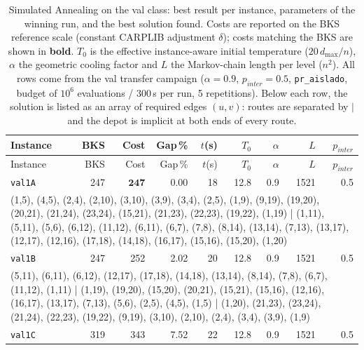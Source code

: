 \begin{landscape}
\begingroup\scriptsize\renewcommand{\arraystretch}{0.95}
\begin{longtable}{lrrrrrrrr}
\caption{Simulated Annealing on the val class: best result per instance, parameters of the winning run, and the best solution found. Costs are reported on the BKS reference scale (constant CARPLIB adjustment $\delta$); costs matching the BKS are shown in \textbf{bold}. $T_0$ is the effective instance-aware initial temperature ($20\,d_{\max}/n$), $\alpha$ the geometric cooling factor and $L$ the Markov-chain length per level ($n^2$). All rows come from the val transfer campaign ($\alpha = 0.9$, $p_{inter} = 0.5$, \texttt{pr\_aislado}, budget of $10^6$ evaluations / 300\,s per run, 5 repetitions). Below each row, the solution is listed as an array of required edges $(u,v)$: routes are separated by $|$ and the depot is implicit at both ends of every route.}\label{tab:sa-val-per-instance}\\
\toprule
Instance & BKS & Cost & Gap\,\% & $t$(s) & $T_0$ & $\alpha$ & $L$ & $p_{inter}$ \\
\midrule
\endfirsthead
\toprule
Instance & BKS & Cost & Gap\,\% & $t$(s) & $T_0$ & $\alpha$ & $L$ & $p_{inter}$ \\
\midrule
\endhead
\bottomrule
\endfoot
\texttt{val1A} & 247 & $\mathbf{247}$ & 0.00 & 18 & 12.8 & 0.9 & 1521 & 0.5 \\
\multicolumn{9}{p{0.96\linewidth}}{\tiny\raggedright\arraybackslash (1,5), (4,5), (2,4), (2,10), (3,10), (3,9), (3,4), (2,5), (1,9), (9,19), (19,20), (20,21), (21,24), (23,24), (15,21), (21,23), (22,23), (19,22), (1,19) | (1,11), (5,11), (5,6), (6,12), (11,12), (6,11), (6,7), (7,8), (8,14), (13,14), (7,13), (13,17), (12,17), (12,16), (17,18), (14,18), (16,17), (15,16), (15,20), (1,20)} \\[2pt]
\texttt{val1B} & 247 & 252 & 2.02 & 20 & 12.8 & 0.9 & 1521 & 0.5 \\
\multicolumn{9}{p{0.96\linewidth}}{\tiny\raggedright\arraybackslash (5,11), (6,11), (6,12), (12,17), (17,18), (14,18), (13,14), (8,14), (7,8), (6,7), (11,12), (1,11) | (1,19), (19,20), (15,20), (20,21), (15,21), (15,16), (12,16), (16,17), (13,17), (7,13), (5,6), (2,5), (4,5), (1,5) | (1,20), (21,23), (23,24), (21,24), (22,23), (19,22), (9,19), (3,10), (2,10), (2,4), (3,4), (3,9), (1,9)} \\[2pt]
\texttt{val1C} & 319 & 343 & 7.52 & 22 & 12.8 & 0.9 & 1521 & 0.5 \\

\end{longtable}
\end{landscape}
